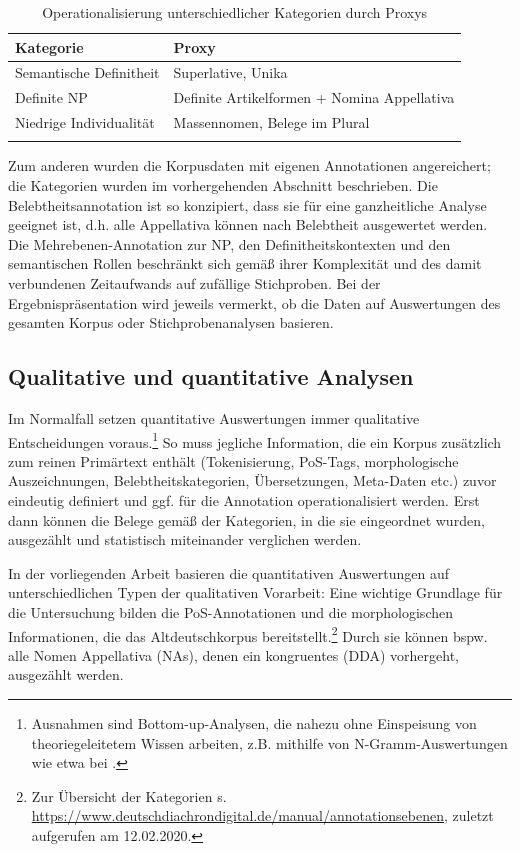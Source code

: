 \begin{table}
\centering
\begin{tabular}{ll}
\lsptoprule
Kategorie     & Proxy            \\ \midrule
Semantische Definitheit & Superlative, Unika            \\
Definite NP             & Definite Artikelformen + Nomina Appellativa        \\
Niedrige Individualität & Massennomen, Belege im Plural \\ \lspbottomrule
\end{tabular}
\caption{Operationalisierung unterschiedlicher Kategorien durch Proxys\label{tab:proxys}}
\end{table}
 
Zum anderen wurden die Korpusdaten mit eigenen Annotationen angereichert; die Kategorien wurden im vorhergehenden Abschnitt beschrieben. Die Belebtheitsannotation ist so konzipiert, dass sie für eine ganzheitliche Analyse geeignet ist, d.h. alle Appellativa können nach Belebtheit ausgewertet werden. Die Mehrebenen-Annotation zur NP, den Definitheitskontexten und den semantischen Rollen beschränkt sich gemäß ihrer Komplexität und des damit verbundenen Zeitaufwands auf zufällige Stichproben. Bei der Ergebnispräsentation wird jeweils vermerkt, ob die Daten auf Auswertungen des gesamten Korpus oder Stichprobenanalysen basieren. 

\subsection{Qualitative und quantitative Analysen}\label{sec:qual-quant}

Im Normalfall setzen quantitative Auswertungen immer qualitative Entscheidungen voraus.\footnote{Ausnahmen sind Bottom-up-Analysen, die nahezu ohne Einspeisung von theoriegeleitetem Wissen arbeiten, z.B. mithilfe von N-Gramm-Auswertungen wie etwa bei \textcite{Scharloth2012}.} So muss jegliche Information, die ein Korpus zusätzlich zum reinen Primärtext enthält (Tokenisierung, PoS-Tags, morphologische Auszeichnungen, Belebtheitskategorien, Übersetzungen, Meta-Daten etc.) zuvor eindeutig definiert und ggf. für die Annotation operationalisiert werden. Erst dann können die Belege gemäß der Kategorien, in die sie eingeordnet wurden, ausgezählt und statistisch miteinander verglichen werden.   

In der vorliegenden Arbeit basieren die quantitativen Auswertungen auf unterschiedlichen Typen der qualitativen Vorarbeit:
Eine wichtige Grundlage für die Untersuchung bilden die PoS-Annotationen und die morphologischen Informationen, die das Altdeutschkorpus bereitstellt.\footnote{Zur Übersicht der Kategorien s. \url{https://www.deutschdiachrondigital.de/manual/annotationsebenen}, zuletzt aufgerufen am 12.02.2020.} Durch sie können bspw. alle Nomen Appellativa (NAs), denen ein kongruentes  (DDA) vorhergeht, ausgezählt werden.

